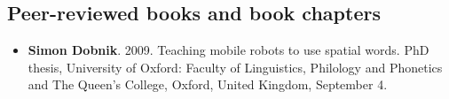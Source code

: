 \documentclass{article}
\begin{document}
\subsection*{Peer-reviewed books and book chapters}


\begin{itemize}
\item \textbf{Simon Dobnik}. 2009. Teaching mobile robots to use spatial words. PhD thesis, University of Oxford: Faculty of Linguistics, Philology and Phonetics and The Queen’s College, Oxford, United Kingdom, September 4.

\end{itemize}
\end{document}
